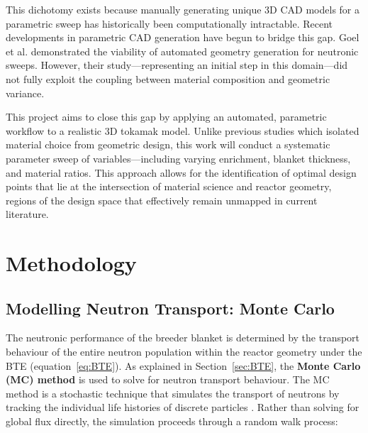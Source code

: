 \documentclass[12pt]{article}
\begin{document}
This dichotomy exists because manually generating unique 3D CAD models for a parametric sweep has
historically been computationally intractable. Recent developments in parametric CAD generation have
begun to bridge this gap. Goel et al. \cite{goel_optimisation_2023} demonstrated the viability of
automated geometry generation for neutronic sweeps. However, their study—representing an initial
step in this domain—did not fully exploit the coupling between material composition and geometric
variance.

This project aims to close this gap by applying an automated, parametric workflow to a realistic 3D
tokamak model. Unlike previous studies which isolated material choice from geometric design, this
work will conduct a systematic parameter sweep of variables—including varying 
enrichment, blanket thickness, and material ratios. This approach allows for the identification of
optimal design points that lie at the intersection of material science and reactor geometry, regions
of the design space that effectively remain unmapped in current literature.



\section{Methodology}
\label{sec:methodology}

\subsection{Modelling Neutron Transport: Monte Carlo}
\label{sec:MC}

The neutronic performance of the breeder blanket is determined by the transport behaviour of the
entire neutron population within the reactor geometry under the BTE (equation~\ref{eq:BTE}). As
explained in Section~\ref{sec:BTE}, the \textbf{Monte Carlo (MC) method} is used to solve for
neutron transport behaviour. The MC method is a stochastic technique that simulates the transport of
neutrons by tracking the individual life histories of discrete particles \cite{kalos_monte_2008}.
Rather than solving for global flux directly, the simulation proceeds through a random walk process:
\end{document}
